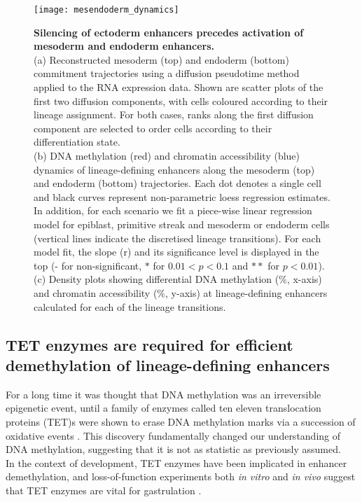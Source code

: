 \begin{figure}[H]
	\centering
	\texttt{[image: mesendoderm\_dynamics]}
	\caption[]{
	\textbf{Silencing of ectoderm enhancers precedes activation of mesoderm and endoderm enhancers.} \\
	(a) Reconstructed mesoderm (top) and endoderm (bottom) commitment trajectories using a diffusion pseudotime method applied to the RNA expression data. Shown are scatter plots of the first two diffusion components, with cells coloured according to their lineage assignment. For both cases, ranks along the first diffusion component are selected to order cells according to their differentiation state. \\
	(b) DNA methylation (red) and chromatin accessibility (blue) dynamics of lineage-defining enhancers along the mesoderm (top) and endoderm (bottom) trajectories. Each dot denotes a single cell and black curves represent non-parametric loess regression estimates. In addition, for each scenario we fit a piece-wise linear regression model for epiblast, primitive streak and mesoderm or endoderm cells (vertical lines indicate the discretised lineage transitions). For each model fit, the slope (r) and its significance level is displayed in the top (- for non-significant, $*$ for $0.01<p<0.1$ and $**$ for $p<0.01$).\\
	(c) Density plots showing differential DNA methylation (\%, x-axis) and chromatin accessibility (\%, y-axis) at lineage-defining enhancers calculated for each of the lineage transitions.
	}
	\label{fig:mesendoderm_dynamics}
\end{figure}


\subsection{TET enzymes are required for efficient demethylation of lineage-defining enhancers}

For a long time it was thought that DNA methylation was an irreversible epigenetic event, until a family of enzymes called ten eleven translocation proteins (TET)s were shown to erase DNA methylation marks via a succession of oxidative events \cite{Rasmussen2016}. This discovery fundamentally changed our understanding of DNA methylation, suggesting that it is not as statistic as previously assumed.\\
In the context of development, TET enzymes have been implicated in enhancer demethylation, and loss-of-function experiments both \textit{in vitro} and \textit{in vivo} suggest that TET enzymes are vital for gastrulation \cite{Dai2016,Sardina2018,Rasmussen2016,Li2016}.

